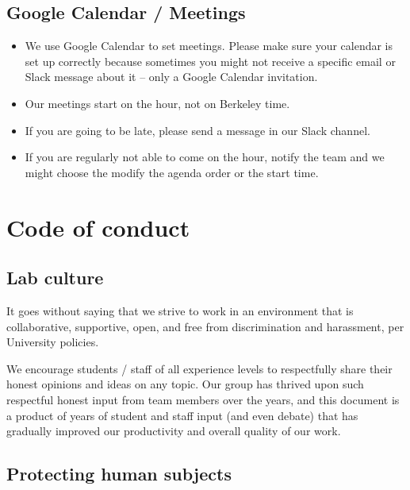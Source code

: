 \documentclass[]{book}
\providecommand{\tightlist}{%
  \setlength{\itemsep}{0pt}\setlength{\parskip}{0pt}}
\begin{document}
\hypertarget{google-calendar-meetings}{%
\section{Google Calendar / Meetings}\label{google-calendar-meetings}}

\begin{itemize}
\tightlist
\item
  We use Google Calendar to set meetings. Please make sure your calendar is set up correctly because sometimes you might not receive a specific email or Slack message about it -- only a Google Calendar invitation.
\item
  Our meetings start on the hour, not on Berkeley time.
\item
  If you are going to be late, please send a message in our Slack channel.
\item
  If you are regularly not able to come on the hour, notify the team and we might choose the modify the agenda order or the start time.
\end{itemize}

\hypertarget{code-of-conduct}{%
\chapter{Code of conduct}\label{code-of-conduct}}

\hypertarget{lab-culture}{%
\section{Lab culture}\label{lab-culture}}

It goes without saying that we strive to work in an environment that is collaborative, supportive, open, and free from discrimination and harassment, per University policies.

We encourage students / staff of all experience levels to respectfully share their honest opinions and ideas on any topic. Our group has thrived upon such respectful honest input from team members over the years, and this document is a product of years of student and staff input (and even debate) that has gradually improved our productivity and overall quality of our work.

\hypertarget{protecting-human-subjects}{%
\section{Protecting human subjects}\label{protecting-human-subjects}}
\end{document}
